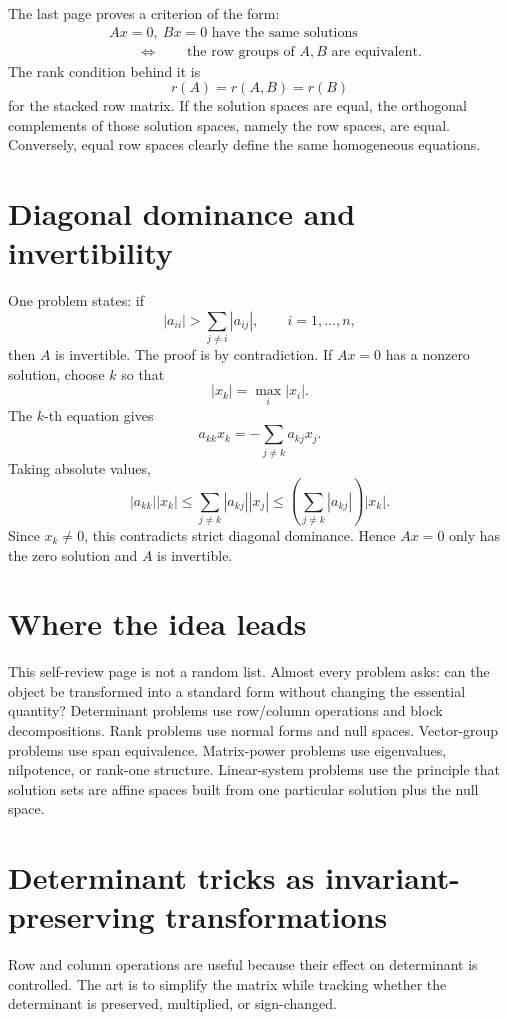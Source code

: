 The last page proves a criterion of the form:
\[
\begin{aligned}
  &Ax=0,\ Bx=0\text{ have the same solutions}\\
  &\qquad\Longleftrightarrow\qquad
  \text{the row groups of }A,B\text{ are equivalent}.
\end{aligned}
\]
The rank condition behind it is
\[
  r(A)=r(A,B)=r(B)
\]
for the stacked row matrix.  If the solution spaces are equal, the orthogonal complements of those solution spaces, namely the row spaces, are equal.  Conversely, equal row spaces clearly define the same homogeneous equations.

\section{Diagonal dominance and invertibility}

One problem states: if
\[
  |a_{ii}|>\sum_{j\ne i}|a_{ij}|,\qquad i=1,\ldots,n,
\]
then $A$ is invertible.  The proof is by contradiction.  If $Ax=0$ has a nonzero solution, choose $k$ so that
\[
  |x_k|=\max_i|x_i|.
\]
The $k$-th equation gives
\[
  a_{kk}x_k=-\sum_{j\ne k}a_{kj}x_j.
\]
Taking absolute values,
\[
  |a_{kk}||x_k|
  \le \sum_{j\ne k}|a_{kj}||x_j|
  \le \left(\sum_{j\ne k}|a_{kj}|
\right)|x_k|.
\]
Since $x_k\ne0$, this contradicts strict diagonal dominance.  Hence $Ax=0$ only has the zero solution and $A$ is invertible.

\section{Where the idea leads}

This self-review page is not a random list.  Almost every problem asks: can the object be transformed into a standard form without changing the essential quantity?  Determinant problems use row/column operations and block decompositions.  Rank problems use normal forms and null spaces.  Vector-group problems use span equivalence.  Matrix-power problems use eigenvalues, nilpotence, or rank-one structure.  Linear-system problems use the principle that solution sets are affine spaces built from one particular solution plus the null space.

\section{Determinant tricks as invariant-preserving transformations}
Row and column operations are useful because their effect on determinant is controlled.  The art is to simplify the matrix while tracking whether the determinant is preserved, multiplied, or sign-changed.
